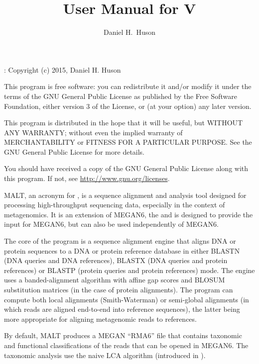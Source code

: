 \documentclass[11pt]{article}
\title{\bf User Manual for \MALT V\VERSION}
\author{Daniel H.~Huson}
\newcommand\MALT{{\sf MALT}\xspace}
\begin{document}

\maketitle


{\small
\setcounter{tocdepth}{1}
\tableofcontents
}
\newpage

:
Copyright (c) 2015, Daniel H. Huson 

This program is free software: you can redistribute it and/or modify
it under the terms of the GNU General Public License as published by
the Free Software Foundation, either version 3 of the License, or
(at your option) any later version.

This program is distributed in the hope that it will be useful,
but WITHOUT ANY WARRANTY; without even the implied warranty of
MERCHANTABILITY or FITNESS FOR A PARTICULAR PURPOSE.  See the
GNU General Public License for more details.

You should have received a copy of the GNU General Public License
along with this program.  If not, see \url{http://www.gnu.org/licenses}.



\MALT, an acronym for  , is a sequence alignment and analysis tool designed for processing high-throughput sequencing data, especially in the context of metagenomics.
It is an extension of MEGAN6, the  and is designed to provide the input for MEGAN6,
but can also be used independently of MEGAN6.

The core of the program is a sequence alignment engine that aligns DNA or protein sequences
to a {DNA or} protein reference database in either {BLASTN (DNA queries and DNA references),}
BLASTX (DNA queries and protein references) or BLASTP (protein queries and protein references)
mode. The engine uses a banded-alignment algorithm with affine gap scores
and BLOSUM substitution matrices (in the case of protein alignments).
The program can compute both local alignments
(Smith-Waterman) or semi-global alignments (in which reads are aligned end-to-end into reference sequences), the latter being more appropriate for aligning metagenomic reads to references.

By default, \MALT produces a MEGAN ``RMA6'' file that contains taxonomic and functional classifications of the reads
that can be opened in MEGAN6.
The taxonomic analysis use the naive LCA algorithm (introduced in \cite{MEGAN2011}).
\end{document}
